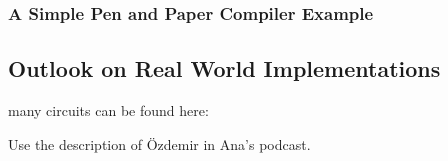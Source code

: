 

\subsubsection{A Simple Pen and Paper Compiler Example}


\subsection{Outlook on Real World Implementations}
many circuits can be found here:

Use the description of Özdemir in Ana's podcast. 

